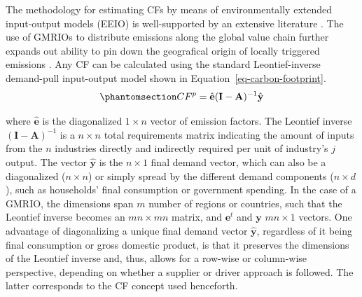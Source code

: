 \documentclass[
  10pt,
  twocolumn]{aft}
\begin{document}
The methodology for estimating CFs by means of environmentally extended
input-output models (EEIO) is well-supported by an extensive literature
\citep{miller_input-output_2022, ivanova_mapping_2017, eurostat_manual_2015, eea_environmental_2013, martinezIdentifyingEnvironmentalFootprint2019}.
The use of GMRIOs to distribute emissions along the global value chain
further expands out ability to pin down the geografical origin of
locally triggered emissions
\citep{wiedmann_threescope_2021, wiedmann_concept_2016, remond-tiedrez_eu_2019}.
Any CF can be calculated using the standard Leontief-inverse demand-pull
input-output model shown in Equation~\ref{eq-carbon-footprint}.
\begin{equation}\phantomsection\label{eq-carbon-footprint}{
CF^p = \hat{\textbf{e}}(\textbf{I} - \textbf{A})^{-1}\hat{\textbf{y}} 
}\end{equation}

where \(\hat{\textbf{e}}\) is the diagonalized \(1 \times n\) vector of
emission factors. The Leontief inverse
\((\textbf{I} - \textbf{A})^{-1}\) is a \(n \times n\) total
requirements matrix indicating the amount of inputs from the \(n\)
industries directly and indirectly required per unit of industry's \(j\)
output. The vector \(\hat{\textbf{y}}\) is the \(n \times 1\) final
demand vector, which can also be a diagonalized (\(n \times n\)) or
simply spread by the different demand components (\(n \times d\)), such
as households' final consumption or government spending. In the case of
a GMRIO, the dimensions span \(m\) number of regions or countries, such
that the Leontief inverse becomes an \(mn \times mn\) matrix, and
\(\textbf{e}^t\) and \(\textbf{y}\) \(mn \times 1\) vectors. One
advantage of diagonalizing a unique final demand vector
\(\hat{\textbf{y}}\), regardless of it being final consumption or gross
domestic product, is that it preserves the dimensions of the Leontief
inverse and, thus, allows for a row-wise or column-wise perspective,
depending on whether a supplier or driver approach is followed. The
latter corresponds to the CF concept used henceforth.
\end{document}
